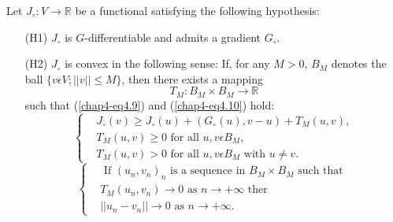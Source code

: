 Let $J_{\circ} : V \to \mathbb{R}$ be a functional satisfying the following hypothesis:
\begin{enumerate}
\item[(H1)] $J_{\circ}$ is $G$-differentiable and admits a gradient $G_{\circ}$.

\item[(H2)] $J_{\circ}$ is convex in the following sense: If, for any $M > 0$, $B_{M}$ denotes the ball $\{v \epsilon V ; ||v|| \leq M\}$, then there exists a mapping
$$
T_{M} : B_{M} \times B_{M} \to \mathbb{R} 
$$
such that (\ref{chap4-eq4.9}) and (\ref{chap4-eq4.10}) hold:
\begin{equation*}
\begin{cases}
& J_{\circ}(v) \geq J_{\circ} (u) + (G_{\circ}(u), v-u) + T_{M} (u, v),\\
& T_{M}(u, v) \geq 0 \text{ for all } u, v \epsilon B_{M},\\
& T_{M} (u, v) > 0 \text{ for all } u, v \epsilon B_{M} \text{ with } u \neq v.\tag{4.9}\label{chap4-eq4.9}
\end{cases}
\end{equation*}
\begin{equation*}
\begin{cases}
& \text{ If } (u_{n}, v_{n})_{n} \text{ is a sequence in } B_{M} \times B_{M} \text{ such that }\\
& T_{M} (u_{n}, v_{n}) \to 0 \text{ as } n \to + \infty \text{ ther }\\
& ||u_{n} - v_{n}|| \to 0 \text{ as } n \to + \infty.
\end{cases}\tag{4.10}\label{chap4-eq4.10}
\end{equation*}\pageoriginale


\end{enumerate}
